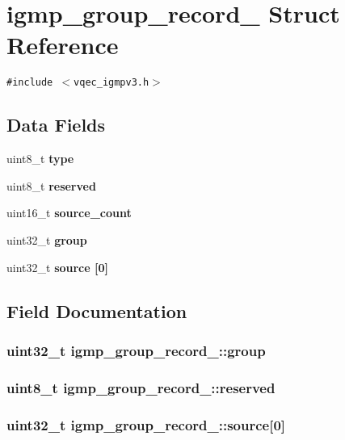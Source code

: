 \section{igmp\_\-group\_\-record\_\- Struct Reference}
\label{structigmp__group__record__}
{\tt \#include $<$vqec\_\-igmpv3.h$>$}

\subsection*{Data Fields}
\begin{CompactItemize}
\item 
uint8\_\-t \bf{type}
\item 
uint8\_\-t \bf{reserved}
\item 
uint16\_\-t \bf{source\_\-count}
\item 
uint32\_\-t \bf{group}
\item 
uint32\_\-t \bf{source} [0]
\end{CompactItemize}


\subsection{Field Documentation}
\subsubsection{\setlength{\rightskip}{0pt plus 5cm}uint32\_\-t \bf{igmp\_\-group\_\-record\_\-::group}}\label{structigmp__group__record___17ee1854fa19c54766aa25711c1fc6e8}


\subsubsection{\setlength{\rightskip}{0pt plus 5cm}uint8\_\-t \bf{igmp\_\-group\_\-record\_\-::reserved}}\label{structigmp__group__record___cb29596ff5104dc6e2d4401e3b5a0696}


\subsubsection{\setlength{\rightskip}{0pt plus 5cm}uint32\_\-t \bf{igmp\_\-group\_\-record\_\-::source}[0]}\label{structigmp__group__record___b5756a5f6c157be46a9b42cec2955606}


